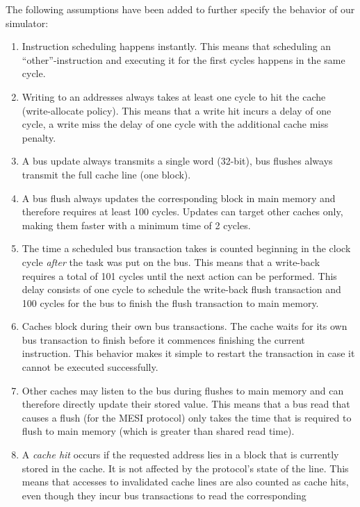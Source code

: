 The following assumptions have been added to further specify the behavior of our simulator:
\begin{enumerate}
    \item Instruction scheduling happens instantly. This means that scheduling an ``other''-instruction
          and executing it for the first cycles happens in the same cycle.
    \item Writing to an addresses always takes at least one cycle to hit the cache (write-allocate
          policy). This means that a write hit incurs a delay of one cycle, a write miss the delay of one
          cycle with the additional cache miss penalty.
    \item A bus update always transmits a single word (32-bit), bus flushes always
          transmit the full cache line (one block).
    \item A bus flush always updates the corresponding block in main memory and therefore requires at
          least 100 cycles. Updates can target other caches only, making them faster with a minimum time of 2 cycles.
    \item The time a scheduled bus transaction takes is counted beginning in the clock cycle \emph{after} the task was put on the
          bus. This means that a write-back requires a total of 101 cycles until the next action can be
          performed. This delay consists of one cycle to schedule the write-back flush transaction and 100
          cycles for the bus to finish the flush transaction to main memory.
    \item Caches block during their own bus transactions. The cache waits for its own bus transaction
          to finish before it commences finishing the current instruction. This behavior makes it simple to
          restart the transaction in case it cannot be executed successfully.
    \item Other caches may listen to the bus during flushes to main memory and can therefore directly
          update their stored value. This means that a bus read that causes a flush (for the MESI protocol) only takes the
          time that is required to flush to main memory (which is greater than shared read time).
    \item A \emph{cache hit} occurs if the requested address lies in a block that is currently stored in the cache. It is
          not affected by the protocol's state of the line. This means that accesses to invalidated cache lines
          are also counted as cache hits, even though they incur bus transactions to read the corresponding

\end{enumerate}

